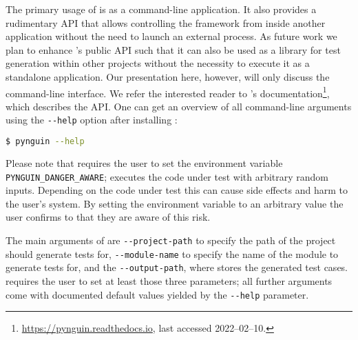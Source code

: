 The primary usage of \pynguin is as a command-line application.
%
It also provides a rudimentary API
that allows controlling the framework from inside another application
without the need to launch an external process.
%
As future work
we plan to enhance \pynguin's public API
such that it can also be used as a library for test generation
within other projects
without the necessity to execute it as a standalone application.
%
Our presentation here,
however,
will only discuss the command-line interface.
%
We refer the interested reader to \pynguin's documentation\footnote{%
  \url{https://pynguin.readthedocs.io}, last accessed 2022–02–10.%
}, which describes the API.
%
One can get an overview of all command-line arguments
using the \verb!--help! option
after installing \pynguin:
%
\begin{lstlisting}[language=bash]
$ pynguin --help
\end{lstlisting}

Please note that \pynguin requires the user
to set the environment variable \verb!PYNGUIN_DANGER_AWARE!;
\pynguin executes the code under test
with arbitrary random inputs.
%
Depending on the code under test
this can cause side effects and harm to the user's system.
%
By setting the environment variable to an arbitrary value
the user confirms to \pynguin that they are aware of this risk.
%

The main arguments of \pynguin are \verb!--project-path!
to specify the path of the project
\pynguin should generate tests for,
\verb!--module-name! to specify the name of the module
to generate tests for,
and the \verb!--output-path!,
where \pynguin stores the generated test cases.
%
\Pynguin requires the user to set at least those three parameters;
all further arguments come with documented default values
yielded by the \verb!--help! parameter.
%

